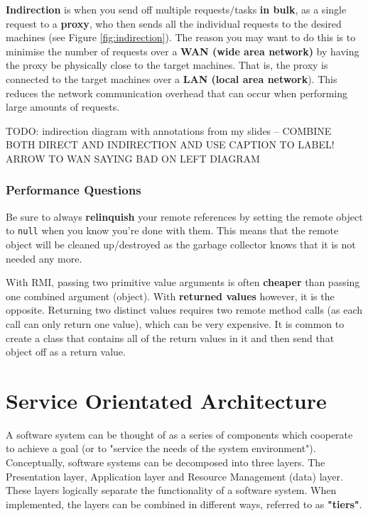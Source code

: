 \documentclass{article}
\begin{document}
\textbf{Indirection} is when you send off multiple requests/tasks \textbf{in bulk}, as a single request to a \textbf{proxy}, who then sends all the individual requests to the desired machines (see Figure \ref{fig:indirection}). The reason you may want to do this is to minimise the number of requests over a \textbf{WAN (wide area network)} by having the proxy be physically close to the target machines. That is, the proxy is connected to the target machines over a \textbf{LAN (local area network}). This reduces the network communication overhead that can occur when performing large amounts of requests.

TODO: indirection diagram with annotations from my slides -- COMBINE BOTH DIRECT AND INDIRECTION AND USE CAPTION TO LABEL! ARROW TO WAN SAYING BAD ON LEFT DIAGRAM

\subsubsection{Performance Questions}

Be sure to always \textbf{relinquish} your remote references by setting the remote object to \texttt{null} when you know you're done with them. This means that the remote object will be cleaned up/destroyed as the garbage collector knows that it is not needed any more.

With RMI, passing two primitive value arguments is often \textbf{cheaper} than passing one combined argument (object). With \textbf{returned values} however, it is the opposite. Returning two distinct values requires two remote method calls (as each call can only return one value), which can be very expensive. It is common to create a class that contains all of the return values in it and then send that object off as a return value.

\section{Service Orientated Architecture}

A software system can be thought of as a series of components which cooperate to achieve a goal (or to "service the needs of the system environment"). Conceptually, software systems can be decomposed into three layers. The Presentation layer, Application layer and Resource Management (data) layer. These layers logically separate the functionality of a software system. When implemented, the layers can be combined in different ways, referred to as \textbf{"tiers"}.
\end{document}
